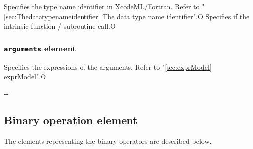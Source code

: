 \begin{XcodeMLAttributes}
{Specifies the type name identifier in XcodeML/Fortran.
 Refer to "\ref{sec:Thedatatypenameidentifier} The data type name identifier".}{O}
{Specifies if the intrinsic function / subroutine call.}{O}
\end{XcodeMLAttributes}


\subsubsection{ {\tt arguments} element}


\begin{XcodeMLChildElements}
{Specifies the expressions of the arguments. Refer to "\ref{sec:exprModel} exprModel".}{O}
\end{XcodeMLChildElements}

\begin{XcodeMLAttributes}
\XcodeMLAttrDef{-}{-}
{-}{-}
\end{XcodeMLAttributes}


\subsection{Binary operation element}

The elements representing the binary operators are described below.
\newline

\begin{XcodeMLOperations}
\end{XcodeMLOperations}

